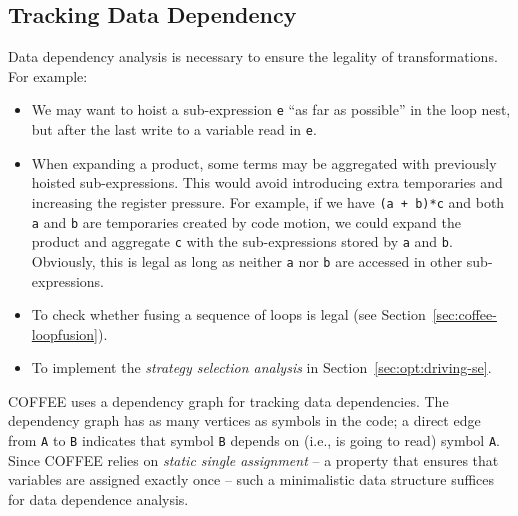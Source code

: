 %


\subsection{Tracking Data Dependency}
Data dependency analysis is necessary to ensure the legality of transformations. For example:
\begin{itemize}
\item We may want to hoist a sub-expression \texttt{e} ``as far as possible'' in the loop nest, but after the last write to a variable read in \texttt{e}.
\item When expanding a product, some terms may be aggregated with previously hoisted sub-expressions. This would avoid introducing extra temporaries and increasing the register pressure. For example, if we have \texttt{(a + b)*c} and both \texttt{a} and \texttt{b} are temporaries created by code motion, we could expand the product and aggregate \texttt{c} with the sub-expressions stored by \texttt{a} and \texttt{b}. Obviously, this is legal as long as neither \texttt{a} nor \texttt{b} are accessed in other sub-expressions.
\item To check whether fusing a sequence of loops is legal (see Section~\ref{sec:coffee-loopfusion}).
\item To implement the {\em strategy selection analysis} in Section~\ref{sec:opt:driving-se}.
\end{itemize}

COFFEE uses a dependency graph for tracking data dependencies. The dependency graph has as many vertices as symbols in the code; a direct edge from \texttt{A} to \texttt{B} indicates that symbol \texttt{B} depends on (i.e., is going to read) symbol \texttt{A}. Since COFFEE relies on \textit{static single assignment} -- a property that ensures that variables are assigned exactly once -- such a minimalistic data structure suffices for data dependence analysis.

